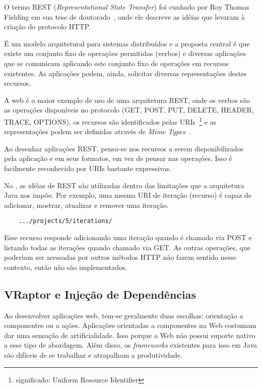 O termo REST (\textit{Representational State Transfer}) foi cunhado por Roy Thomas Fielding em sua tese de doutorado~\cite{rest-roy}, onde ele descreve as idéias que levaram à criação do protocolo HTTP.

É um modelo arquitetural para sistemas distribuídos e a proposta central é que existe um conjunto fixo de operações permitidas (verbos) e diversas aplicações que se comunicam aplicando este conjunto fixo de operações em recursos existentes. As aplicações podem, ainda, solicitar diversas representações destes recursos.

A web é o maior exemplo de uso de uma arquitetura REST, onde os verbos são as operações disponíveis no protocolo (GET, POST, PUT, DELETE, HEADER, TRACE, OPTIONS), os recursos são identificados pelas URIs~\footnote{significado: Uniform Resource Identifier} e as representações podem ser definidas através de \textit{Mime Types}~\cite{mimetypes}.

Ao desenhar aplicações REST, pensa-se nos recursos a serem disponibilizados pela aplicação e em seus formatos, em vez de pensar nas operações. Isso é facilmente reconhecido por URIs bastante expressivas.

No \calopsita{}, as idéias de REST são utilizadas dentro das limitações que a arquitetura Java nos impõe. Por exemplo, uma mesma URI de iteração (recurso) é capaz de adicionar, mostrar, atualizar e remover uma iteração.

\begin{verbatim}
	.../projects/5/iterations/
\end{verbatim}

Esse recurso responde adicionando uma iteração quando é chamado via POST e listando todas as iterações quando chamado via GET. As outras operações, que poderiam ser acessadas por outros métodos HTTP não fazem sentido nesse contexto, então não são implementados.

\subsection{VRaptor e Injeção de Dependências}

Ao desenvolver aplicações web, tem-se geralmente duas escolhas: orientação a componentes ou a ações. Aplicações orientadas a componentes na Web costumam dar uma sensação de artificialidade. Isso porque a Web não possui suporte nativo a esse tipo de abordagem. Além disso, os \textit{frameworks} existentes para isso em Java são difíceis de se trabalhar e atrapalham a produtividade. 


